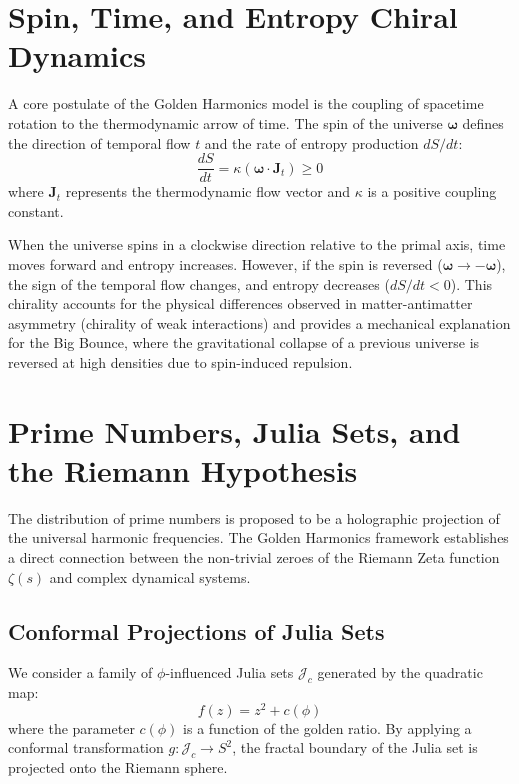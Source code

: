 \documentclass[11pt,twoside,a4paper]{article}
\begin{document}
\section{Spin, Time, and Entropy Chiral Dynamics}
A core postulate of the Golden Harmonics model is the coupling of spacetime rotation to the thermodynamic arrow of time. The spin of the universe $\boldsymbol{\omega}$ defines the direction of temporal flow $t$ and the rate of entropy production $dS/dt$:
\begin{equation}
\frac{dS}{dt} = \kappa (\boldsymbol{\omega} \cdot \mathbf{J}_t) \ge 0
\end{equation}
where $\mathbf{J}_t$ represents the thermodynamic flow vector and $\kappa$ is a positive coupling constant.

When the universe spins in a clockwise direction relative to the primal axis, time moves forward and entropy increases. However, if the spin is reversed ($\boldsymbol{\omega} \to -\boldsymbol{\omega}$), the sign of the temporal flow changes, and entropy decreases ($dS/dt < 0$). This chirality accounts for the physical differences observed in matter-antimatter asymmetry (chirality of weak interactions) and provides a mechanical explanation for the Big Bounce, where the gravitational collapse of a previous universe is reversed at high densities due to spin-induced repulsion.

\section{Prime Numbers, Julia Sets, and the Riemann Hypothesis}
The distribution of prime numbers is proposed to be a holographic projection of the universal harmonic frequencies. The Golden Harmonics framework establishes a direct connection between the non-trivial zeroes of the Riemann Zeta function $\zeta(s)$ and complex dynamical systems.

\subsection{Conformal Projections of Julia Sets}
We consider a family of $\phi$-influenced Julia sets $\mathcal{J}_c$ generated by the quadratic map:
\begin{equation}
f(z) = z^2 + c(\phi)
\end{equation}
where the parameter $c(\phi)$ is a function of the golden ratio. By applying a conformal transformation $g: \mathcal{J}_c \to S^2$, the fractal boundary of the Julia set is projected onto the Riemann sphere. 
\end{document}
